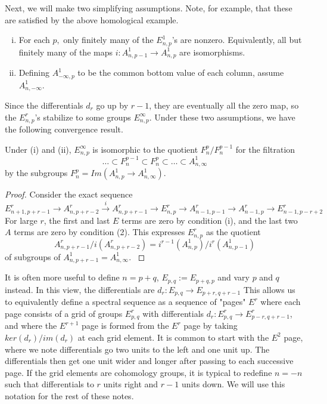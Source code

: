 Next, we will make two simplifying assumptions. Note, for example, that these are satisfied by the above homological example.
\begin{enumerate}[(i)]
    \item For each $p,$ only finitely many of the $E^1_{n,p}$'s are nonzero. Equivalently, all but finitely many of the maps $i:A^1_{n,p-1}\rightarrow A^1_{n,p}$ are isomorphisms.
    \item Defining $A^1_{-\infty,p}$ to be the common bottom value of each column, assume $A^1_{n,-\infty}$.
\end{enumerate}
Since the differentials $d_r$ go up by $r-1$, they are eventually all the zero map, so the $E^r_{n,p}$'s stabilize to some groups $E^{\infty}_{n,p}$. Under these two assumptions, we have the following convergence result.

\begin{proposition}
Under (i) and (ii), $E^\infty_{n,p}$ is isomorphic to the quotient $F^p_n/F^{p-1}_n$ for the filtration
$$\dots \subset F_n^{p-1}\subset F_n^{p}\subset\dots \subset A^1_{n,\infty}$$ by the subgroups $F_n^p=Im(A^1_{n,p}\rightarrow A^1_{n,\infty})$.
\end{proposition}
\begin{proof}
Consider the exact sequence
$$E^r_{n+1,p+r-1}\rightarrow A^r_{n,p+r-2}\xrightarrow{i} A^r_{n,p+r-1}\rightarrow E^r_{n,p}\rightarrow A^r_{n-1,p-1}\rightarrow A^r_{n-1,p}\rightarrow E^r_{n-1,p-r+2}$$ For large $r$, the first and last $E$ terms are zero by condition (i), and the last two $A$ terms are zero by condition (2). This expresses $E^r_{n,p}$ as the quotient $$A^r_{n,p+r-1}/i(A^r_{n,p+r-2})=i^{r-1}(A^1_{n,p})/i^{r}(A^1_{n,p-1})$$ of subgroups of $A^1_{n,p+r-1}=A^1_{n,\infty}$.
\cite{Hatcher-spec}\end{proof}

It is often more useful to define $n=p+q$, $E_{p,q}:=E_{p+q,p}$  and vary $p$ and $q$ instead. In this view, the differentials are $d_r:E_{p,q}\rightarrow E_{p+r,q+r-1}$ This allows us to equivalently define a spectral sequence as a sequence of "pages" $E^r$ where each page consists of a grid of groups $E^r_{p,q}$ with differentials $d_r:E^r_{p,q}\rightarrow E^r_{p-r,q+r-1}$, and where the $E^{r+1}$ page is formed from the $E^r$ page by taking $ker(d_r)/im(d_r)$ at each grid element. It is common to start with the $E^2$ page, where we note differentials go two units to the left and one unit up. The differentials then get one unit wider and longer after passing to each successive page. If the grid elements are cohomology groups, it is typical to redefine $n=-n$ such that differentials to $r$ units right and $r-1$ units down. We will use this notation for the rest of these notes.